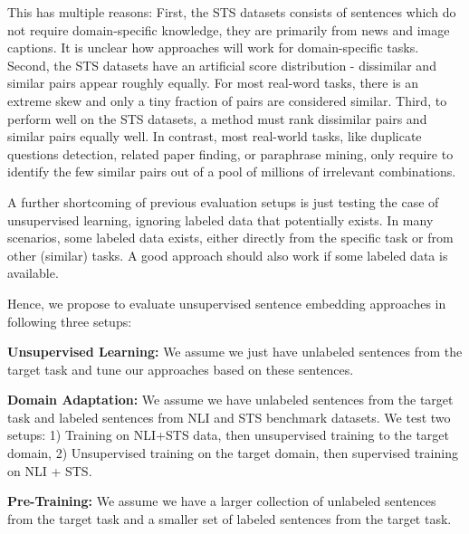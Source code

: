 \documentclass[11pt]{article}
\begin{document}
This has multiple reasons: First, the STS datasets consists of sentences which do not require domain-specific knowledge, they are primarily from news and image captions. It is unclear how approaches will work for domain-specific tasks. Second, the STS datasets have an artificial score distribution - dissimilar and similar pairs appear roughly equally. For most real-word tasks, there is an extreme skew and only a tiny fraction of pairs are considered similar. Third, to perform well on the STS datasets, a method must rank dissimilar pairs and similar pairs equally well. In contrast, most real-world tasks, like duplicate questions detection, related paper finding, or paraphrase mining, only require to identify the few similar pairs out of a pool of millions of irrelevant combinations. 

A further shortcoming of previous evaluation setups is just testing the case of unsupervised learning, ignoring labeled data that potentially exists. In many scenarios, some labeled data exists, either directly from the specific task or from other (similar) tasks. A good approach should also work if some labeled data is available.

Hence, we propose to evaluate unsupervised sentence embedding approaches in following three setups:

\textbf{Unsupervised Learning:} We assume we just have unlabeled sentences from the target task and tune our approaches based on these sentences.

\textbf{Domain Adaptation:} We assume we have unlabeled sentences from the target task and labeled sentences from NLI \cite{DBLP:conf/emnlp/BowmanAPM15, DBLP:conf/naacl/WilliamsNB18} and STS benchmark \cite{cer-etal-2017-semeval} datasets. We test two setups: 1) Training on NLI+STS data, then unsupervised training to the target domain, 2) Unsupervised training on the target domain, then supervised training on NLI + STS.

\textbf{Pre-Training:} We assume we have a larger collection of unlabeled sentences from the target task and a smaller set of labeled sentences from the target task.
\end{document}
